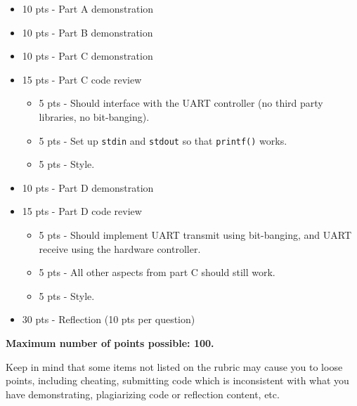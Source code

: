 \documentclass{article}
\begin{document}
\begin{itemize}

	\item 10 pts - Part A demonstration

	\item 10 pts - Part B demonstration

	\item 10 pts - Part C demonstration

	\item 15 pts - Part C code review

	\begin{itemize}

		\item 5 pts - Should interface with the UART controller (no
		third party libraries, no bit-banging).

		\item 5 pts - Set up \texttt{stdin} and \texttt{stdout} so that
		\texttt{printf()} works.

		\item 5 pts - Style.

	\end{itemize}

	\item 10 pts - Part D demonstration

	\item 15 pts - Part D code review

	\begin{itemize}

		\item 5 pts - Should implement UART transmit using bit-banging,
			and UART receive using the hardware controller.

		\item 5 pts - All other aspects from part C should still work.

		\item 5 pts - Style.

	\end{itemize}


	\item 30 pts - Reflection (10 pts per question)

\end{itemize}

\textbf{Maximum number of points possible: 100.}

Keep in mind that some items not listed on the rubric may cause you to loose
points, including cheating, submitting code which is inconsistent with what you
have demonstrating, plagiarizing code or reflection content, etc.
\end{document}
